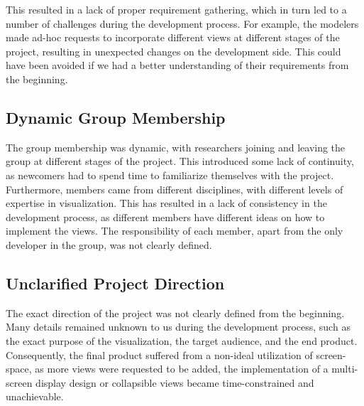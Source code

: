 This resulted in a lack of proper requirement gathering, which in turn led to a number of challenges during the development process.
For example, the modelers made ad-hoc requests to incorporate different views at different stages of the project, resulting in unexpected changes on the development side.
This could have been avoided if we had a better understanding of their requirements from the beginning.

\subsection{Dynamic Group Membership}

The group membership was dynamic, with researchers joining and leaving the group at different stages of the project.
This introduced some lack of continuity, as newcomers had to spend time to familiarize themselves with the project.
Furthermore, members came from different disciplines, with different levels of expertise in visualization.
This has resulted in a lack of consistency in the development process, as different members have different ideas on how to implement the views.
The responsibility of each member, apart from the only developer in the group, was not clearly defined.

\subsection{Unclarified Project Direction}

The exact direction of the project was not clearly defined from the beginning.
Many details remained unknown to us during the development process, such as the exact purpose of the visualization, the target audience, and the end product. 
Consequently, the final product suffered from a non-ideal utilization of screen-space, as more views were requested to be added, the implementation of a multi-screen display design or collapsible views became time-constrained and unachievable.
